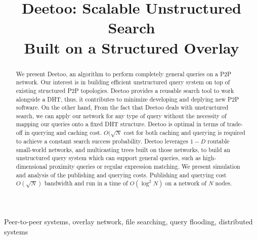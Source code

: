 \documentclass[conference]{IEEEtran}
\begin{document}
\title{Deetoo: Scalable Unstructured Search \\
	Built on a Structured Overlay}
\author{
\and
{}
}
\maketitle

\begin{abstract}

We present Deetoo, an algorithm to perform completely general queries on
a P2P network.  Our interest is in building efficient unstructured
query system on top of existing structured P2P topologies.
Deetoo provides a reusable search tool to work alongside a DHT, thus, 
it contributes to minimize developing and deplying new P2P software.
On the other hand, From the fact that Deetoo deals with unstructured search, 
we can apply our network for any type of query
without the necessity of mapping our queries onto a fixed DHT structure.
Deetoo is optimal in terms of trade-off in querying and caching cost.
$O(\sqrt{N}$ cost for both caching and querying is required to achieve 
a constant search success probability. 
Deetoo leverages $1-D$ routable small-world networks, and multicasting trees
built on those networks, to build an unstructured query system
which can support general queries,
such as high-dimensional proximity queries or regular expression matching.
We present simulation and analysis of the publishing and querying costs.
Publishing and querying cost $O(\sqrt{N})$ bandwidth and
run in a time of $O(\log^2 N)$ on a network of $N$ nodes.

\end{abstract}

\begin{IEEEkeywords}
Peer-to-peer systems, overlay network, file searching,
query flooding, distributed systems
\end{IEEEkeywords}
\IEEEpeerreviewmaketitle
\end{document}
